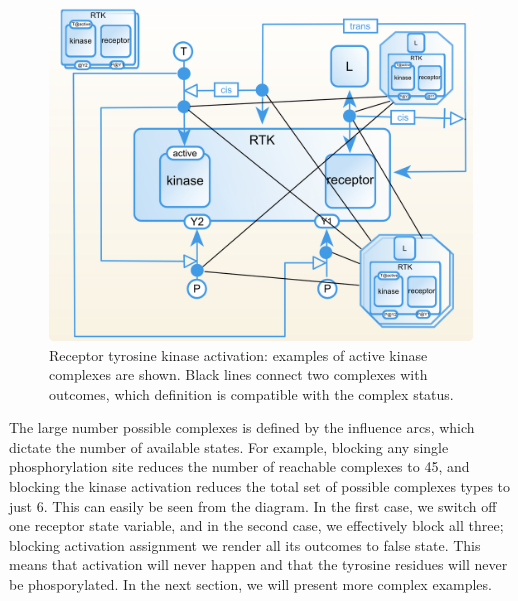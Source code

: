 \begin{figure}[H]
  \centering
  \vspace*{-0.75em}
  \includegraphics[scale=0.75]{examples/rtk-complex.png}
   \caption{Receptor tyrosine kinase activation: examples of active kinase complexes are shown. Black lines connect two complexes with outcomes, which definition is compatible with the complex status.}
  \label{fig:rtk-complexes}
\end{figure}

The large number possible complexes is defined by the influence arcs, which dictate the number of available states. For example, blocking any single phosphorylation site reduces the number of reachable complexes to 45, and blocking the kinase activation reduces the total set of possible complexes types to just 6. This can easily be seen from the diagram. In the first case, we switch off one receptor state variable, and in the second case, we effectively block all three; blocking activation assignment we render all its outcomes to false state. This means that activation will never happen and that the tyrosine residues will never be phosporylated. In the next section, we will present more complex examples. 

